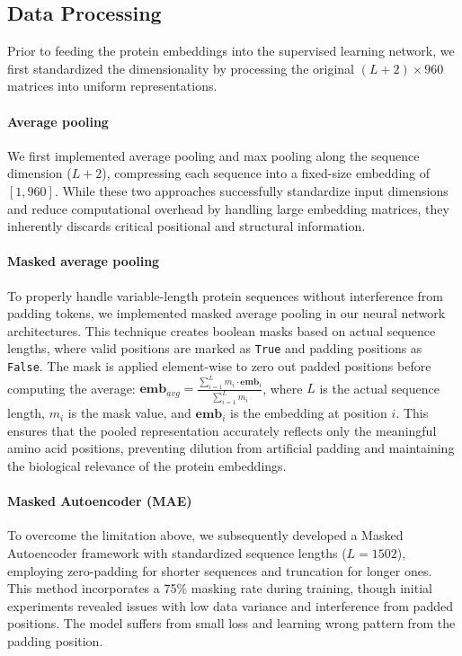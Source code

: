 \documentclass{article}
\begin{document}
\subsection{Data Processing}

	Prior to feeding the protein embeddings into the supervised learning network, we first standardized the dimensionality by processing the original $(L+2) \times 960$ matrices into uniform representations.
	
	\paragraph{Average pooling} We first implemented {average pooling} and {max pooling} along the sequence dimension ($L+2$), compressing each sequence into a fixed-size embedding of $[1, 960]$. While these two approaches successfully standardize input dimensions and reduce computational overhead by handling large embedding matrices, they inherently discards critical positional and structural information.

\paragraph{Masked average pooling} To properly handle variable-length protein sequences without interference from padding tokens, we implemented masked average pooling in our neural network architectures. This technique creates boolean masks based on actual sequence lengths, where valid positions are marked as \texttt{True} and padding positions as \texttt{False}. The mask is applied element-wise to zero out padded positions before computing the average: $\mathbf{emb}_{avg} = \frac{\sum_{i=1}^{L} m_i \cdot \mathbf{emb}_i}{\sum_{i=1}^{L} m_i}$, where $L$ is the actual sequence length, $m_i$ is the mask value, and $\mathbf{emb}_i$ is the embedding at position $i$. This ensures that the pooled representation accurately reflects only the meaningful amino acid positions, preventing dilution from artificial padding and maintaining the biological relevance of the protein embeddings.
	
	\paragraph{Masked Autoencoder (MAE)} To overcome the limitation above, we subsequently developed a {Masked Autoencoder} framework with standardized sequence lengths ($L = 1502$), employing zero-padding for shorter sequences and truncation for longer ones. 
	This method incorporates a 75\% masking rate during training, though initial experiments revealed issues with low data variance and interference from padded positions. The model suffers from small loss and learning wrong pattern from the padding position.
	
\end{document}
